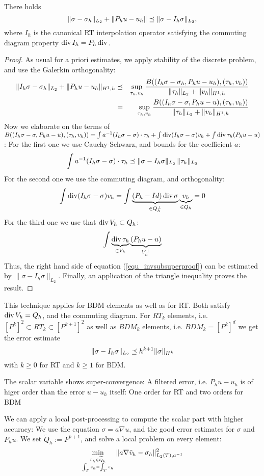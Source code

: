 \begin{theorem} There holds
$$
\| \sigma - \sigma_h \|_{L_2} + \| P_h u - u_h \|  \preceq \| \sigma - I_h \sigma \|_{L_2},
$$
where $I_h$ is the canonical RT interpolation operator satisfying the commuting diagram property $\operatorname{div} I_h = P_h \operatorname{div}$.
\end{theorem}
\begin{proof} As usual for a priori estimates, we apply stability of the discrete problem, and use the Galerkin orthogonality:
\begin{eqnarray}
\| I_h \sigma - \sigma_h \|_{L_2} + \| P_h u - u_h \|_{H^1,h} & \preceq & \sup_{\tau_h, v_h} \frac{B( (I_h \sigma - \sigma_h, P_h u - u_h), (\tau_h, v_h) )}  { \| \tau_h \|_{L_2} + \| v_h \|_{H^1,h}} \\
& = & 
\label{equ_invsubsuperproof}
\sup_{\tau_h, v_h} \frac{B( (I_h \sigma - \sigma, P_h u - u), (\tau_h, v_h) )}  { \| \tau_h \|_{L_2} + \| v_h \|_{H^1,h}} 
\end{eqnarray}
Now we elaborate on the terms of  $B( (I_h \sigma - \sigma, P_h u - u), (\tau_h, v_h) ) = \int a^{-1} (I_h \sigma - \sigma) \cdot \tau_h +
\int \operatorname{div} (I_h \sigma - \sigma) v_h + \int \operatorname{div} \tau_h (P_h u - u)$:
For the first one we use Cauchy-Schwarz, and bounds for the coefficient $a$:
$$
\int a^{-1} (I_h \sigma - \sigma) \cdot \tau_h \preceq \| \sigma - I_h \sigma \|_{L_2} \, \| \tau_h \|_{L_2}
$$
For the second one we use the commuting diagram, and orthogonality:
$$
\int \operatorname{div} (I_h \sigma - \sigma) v_h = \int \underbrace{ (P_h - Id) \operatorname{div} \sigma }_{\in Q_h^\bot} \underbrace{ v_h }_{\in Q_h} = 0
$$
For the third one we use that $\operatorname{div} V_h \subset Q_h$:
$$
\int \underbrace{ \operatorname{div} \tau_h}_{\in V_h}   \underbrace{ (P_h  u - u) }_{V_h^\bot}
$$
Thus, the right hand side of equation (\ref{equ_invsubsuperproof}) can be estimated by $\| \sigma - I_h \sigma \|_{L_2}$. Finally, an application of the
 triangle inequality proves the result.
\end{proof}

\begin{remark} This technique applies for BDM elements as well as for RT. Both satisfy $\operatorname{div} V_h = Q_h$, and the commuting diagram.
For $RT_k$ elements, i.e. $[P^{k}]^2 \subset RT_k \subset [P^{k+1}]^2$ as well as $BDM_k$ elements, i.e. $BDM_k = [P^k]^d$
we get the error estimate
$$
\| \sigma - I_h \sigma \|_{L_2} \preceq h^{k+1} \| \sigma \|_{H^k}
$$ 
with $k \geq 0$ for RT and $k \geq 1$ for BDM.
\end{remark}

\begin{remark} The scalar variable shows super-convergence: A filtered
  error, i.e. $P_h u - u_h$ is of higer order than the error $u - u_h$
  itself: One order for RT and two orders for BDM
\end{remark}
We can apply a local post-processing to compute the scalar part with higher accuracy: We use the equation $\sigma = a \nabla u$, and the good 
error estimates for $\sigma$ and $P_h u$. We set $\widetilde Q_h := P^{k+1}$, and solve a local 
problem on every element:
$$
\min_{\tilde v_h \in \widetilde Q_h \atop \int_T v_h = \int_T \tilde v_h}  \| a \nabla
\tilde v_h - \sigma_h \|_{L_2(T),a^{-1}}^2 
$$

